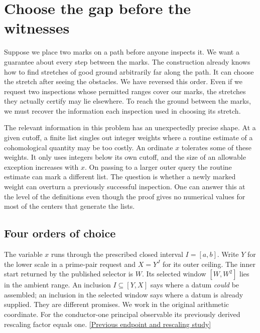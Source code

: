 \documentclass[12pt,letterpaper]{article}
\begin{document}
\section{Choose the gap before the witnesses}
Suppose we place two marks on a path before anyone inspects it. We want a guarantee about every step between the marks. The construction already knows how to find stretches of good ground arbitrarily far along the path. It can choose the stretch after seeing the obstacles. We have reversed this order. Even if we request two inspections whose permitted ranges cover our marks, the stretches they actually certify may lie elsewhere. To reach the ground between the marks, we must recover the information each inspection used in choosing its stretch.

The relevant information in this problem has an unexpectedly precise shape. At a given cutoff, a finite list singles out integer weights where a routine estimate of a cohomological quantity may be too costly. An ordinate \(x\) tolerates some of these weights. It only uses integers below its own cutoff, and the size of an allowable exception increases with \(x\). On passing to a larger outer query the routine estimate can mark a different list. The question is whether a newly marked weight can overturn a previously successful inspection. One can answer this at the level of the definitions even though the proof gives no numerical values for most of the centers that generate the lists.

\subsection{Four orders of choice}
The variable \(x\) runs through the prescribed closed interval \(I=[a,b]\). Write \(Y\) for the lower scale in a prime-pair request and \(X=Y^J\) for its outer ceiling. The inner start returned by the published selector is \(W\). Its selected window \([W,W^2]\) lies in the ambient range. An inclusion \(I\subseteq[Y,X]\) says where a datum \emph{could} be assembled; an inclusion in the selected window says where a datum is already supplied. They are different promises. We work in the original arithmetic coordinate. For the conductor-one principal observable its previously derived rescaling factor equals one. \href{https://github.com/nousentllc/riemann-hypothesis/pull/18}{[Previous endpoint and rescaling study]}
\end{document}
